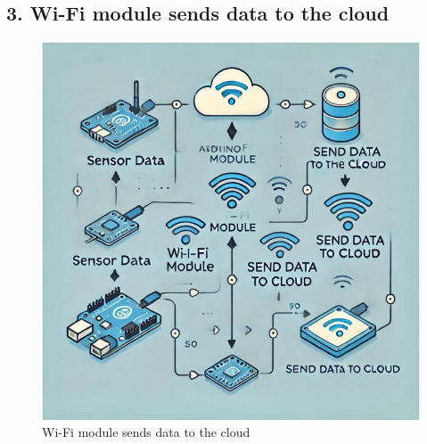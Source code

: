\documentclass[12pt]{report}
\begin{document}
	\subsection*{3. Wi-Fi module sends data to the cloud}
	\begin{figure}[ht]
		\centering
		\includegraphics[scale=1]{wifimodel.jpg}
		\caption[wifi_model]{Wi-Fi module sends data to the cloud}
		\label{wifi_model}
	\end{figure}
	
\end{document}
